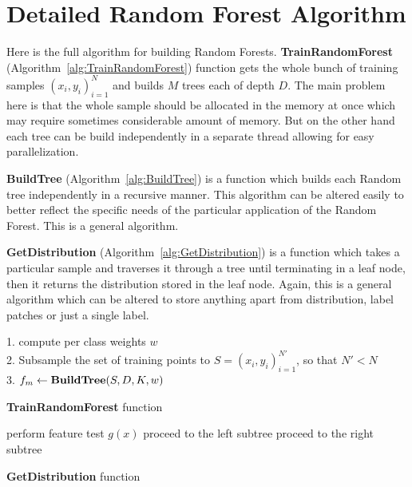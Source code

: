 \chapter{Detailed Random Forest Algorithm}
\label{AppendixA}
Here is the full algorithm for building Random Forests. {\bf TrainRandomForest} (Algorithm~\ref{alg:TrainRandomForest}) function gets the whole 
bunch of training samples ${(x_i, y_i)}_{i = 1}^{N}$
and builds $M$ trees each of depth $D$. The main problem here is that the whole sample should be allocated in the memory at once which may require sometimes
considerable amount of memory. But on the other hand each tree can be build independently in a separate thread allowing for easy parallelization.

{\bf BuildTree} (Algorithm~\ref{alg:BuildTree}) is a function which builds each Random tree independently in a recursive manner. This algorithm can be
altered easily to better reflect the specific needs of the particular application of the Random Forest. This is a general algorithm.

{\bf GetDistribution} (Algorithm~\ref{alg:GetDistribution}) is a function which takes a particular sample and traverses it through a tree until terminating
in a leaf node, then it returns the distribution stored in the leaf node. Again, this is a general algorithm which can be altered to store anything apart
from distribution, \eg label patches or just a single label.

\begin{algorithm}
 \SetAlgoLined
 {
  1. compute per class weights $w$ \\
  2. Subsample the set of training points to $S = {(x_i, y_i)}_{i = 1}^{N'}$, so that $N' < N$ \\
  3. $f_m \leftarrow \text{{\bf BuildTree}}(S, D, K, w)$
 }
 \caption{{\bf TrainRandomForest} function}
 \label{alg:TrainRandomForest}
\end{algorithm}

\begin{algorithm}
 \SetAlgoLined
 {
  perform feature test $g(x)$\;
  {
    proceed to the left subtree\;
  }
  \lElse
  {
    proceed to the right subtree\;
  }
 }
 \caption{{\bf GetDistribution} function}
 \label{alg:GetDistribution}
\end{algorithm}

